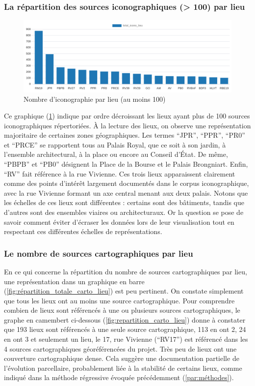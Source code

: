 \subsubsection{La répartition des sources iconographiques (> 100) par lieu}
\begin{figure}[ht!]
    \centering
    \includegraphics[width=1\linewidth]{images/graphiques/nb_icono_lieu_>100.png}
    \caption{Nombre d'iconographie par lieu (au moins 100)}
    \label{fig:répartition_totale_icono_lieu}
\end{figure}
Ce graphique (\ref{fig:répartition_totale_icono_lieu}) indique par ordre décroissant les lieux ayant plus de 100 sources iconographiques répertoriées.  À la lecture des lieux, on observe une représentation majoritaire de certaines zones géographiques. Les termes \enquote{JPR}, \enquote{PPR}, \enquote{PR0} et \enquote{PRCE} se rapportent tous au Palais Royal, que ce soit à son jardin, à l'ensemble architectural, à la place ou encore au Conseil d'État. De même, \enquote{PBPB} et \enquote{PB0} désignent la Place de la Bourse et le Palais Brongniart. Enfin, \enquote{RV} fait référence à la rue Vivienne. Ces trois lieux apparaissent clairement comme des points d'intérêt largement documentés dans le corpus iconographique, avec la rue Vivienne formant un axe central menant aux deux palais. Notons que les échelles de ces lieux sont différentes : certains sont des bâtiments, tandis que d'autres sont des ensembles viaires ou architecturaux. Or la question se pose de savoir comment éviter d'écraser les données lors de leur visualisation tout en respectant ces différentes échelles de représentations.

\subsubsection{Le nombre de sources cartographiques par lieu}
En ce qui concerne la répartition du nombre de sources cartographiques par lieu, une représentation dans un graphique en barre (\ref{fig:répartition_totale_carto_lieu}) est peu pertinent. On constate simplement que tous les lieux ont au moins une source cartographique. Pour comprendre combien de lieux sont référencés à une ou plusieurs sources cartographiques, le graphe en camembert ci-dessous (\ref{fig:repartition_carto_lieu}) donne à constater que 193 lieux sont référencés à une seule source cartographique, 113 en ont 2, 24 en ont 3 et seulement un lieu, le 17, rue Vivienne (\enquote{RV17}) est référencé dans les 4 sources cartographiques géoréférencées du projet. Très peu de lieux ont une couverture cartographique dense. Cela suggère une documentation partielle de l'évolution parcellaire, probablement liée à la stabilité de certains lieux, comme indiqué dans la méthode régressive évoquée précédemment (\ref{par:méthodes}).

